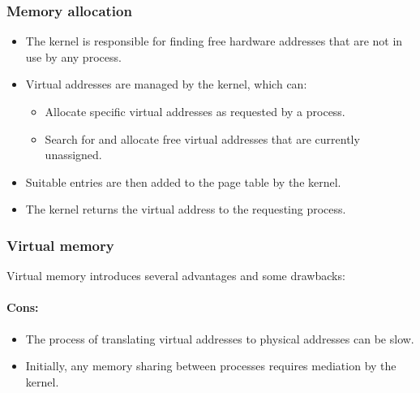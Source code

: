 \documentclass[12pt]{article}
\begin{document}
\subsubsection{Memory allocation}
\begin{itemize}
    \item The kernel is responsible for finding free hardware addresses that are not in use by any process.
    \item Virtual addresses are managed by the kernel, which can:
    \begin{itemize}
        \item Allocate specific virtual addresses as requested by a process.
        \item Search for and allocate free virtual addresses that are currently unassigned.
    \end{itemize}
    \item Suitable entries are then added to the page table by the kernel.
    \item The kernel returns the virtual address to the requesting process.
\end{itemize}

\subsubsection{Virtual memory}
Virtual memory introduces several advantages and some drawbacks:

\paragraph{Cons:}
\begin{itemize}
    \item The process of translating virtual addresses to physical addresses can be slow.
    \item Initially, any memory sharing between processes requires mediation by the kernel.
\end{itemize}
\end{document}
